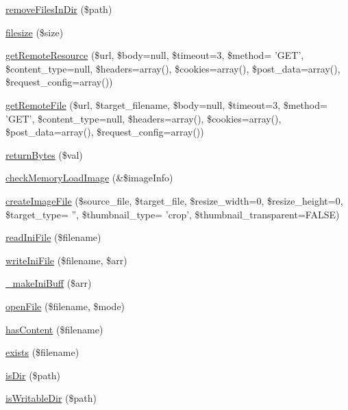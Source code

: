 \begin{DoxyCompactItemize}
\hyperlink{classFileHandler_a07839b4971e9ef40039d23ea65977d69}{remove\-Files\-In\-Dir} (\$path)
\item 
\hyperlink{classFileHandler_ae235b4ded589fb13caed260fabc0a30c}{filesize} (\$size)
\item 
\hyperlink{classFileHandler_a602c039b415c15d9d6866e586282faf7}{get\-Remote\-Resource} (\$url, \$body=null, \$timeout=3, \$method= 'G\-E\-T', \$content\-\_\-type=null, \$headers=array(), \$cookies=array(), \$post\-\_\-data=array(), \$request\-\_\-config=array())
\item 
\hyperlink{classFileHandler_a0e3720cacd0137d537834376ce7b982b}{get\-Remote\-File} (\$url, \$target\-\_\-filename, \$body=null, \$timeout=3, \$method= 'G\-E\-T', \$content\-\_\-type=null, \$headers=array(), \$cookies=array(), \$post\-\_\-data=array(), \$request\-\_\-config=array())
\item 
\hyperlink{classFileHandler_a79dd068137470965b560f4d23d978e7d}{return\-Bytes} (\$val)
\item 
\hyperlink{classFileHandler_a0b240e89b6ce57cb94e855fc25e5e9f3}{check\-Memory\-Load\-Image} (\&\$image\-Info)
\item 
\hyperlink{classFileHandler_a515ef94bb71bc28540e3792ccc234457}{create\-Image\-File} (\$source\-\_\-file, \$target\-\_\-file, \$resize\-\_\-width=0, \$resize\-\_\-height=0, \$target\-\_\-type= '', \$thumbnail\-\_\-type= 'crop', \$thumbnail\-\_\-transparent=F\-A\-L\-S\-E)
\item 
\hyperlink{classFileHandler_a58a8bbae1ab4acb358599db38a47db4d}{read\-Ini\-File} (\$filename)
\item 
\hyperlink{classFileHandler_aa0fd9ce8f2c81bee472a403e75b578bd}{write\-Ini\-File} (\$filename, \$arr)
\item 
\hyperlink{classFileHandler_a8975f9247987757497e0288f3ee09173}{\-\_\-make\-Ini\-Buff} (\$arr)
\item 
\hyperlink{classFileHandler_a690753d8cf8ff837f28a811cdfbfa069}{open\-File} (\$filename, \$mode)
\item 
\hyperlink{classFileHandler_ad872016e83b1f62a03d54e359ce31f73}{has\-Content} (\$filename)
\item 
\hyperlink{classFileHandler_a862c4f6349792ae8f094ec456c9a26ed}{exists} (\$filename)
\item 
\hyperlink{classFileHandler_a5fd371542d6f1a86269d0b8795e74471}{is\-Dir} (\$path)
\item 
\hyperlink{classFileHandler_a9494e34a28f27b6a1ab2e032aada2bbb}{is\-Writable\-Dir} (\$path)
\end{DoxyCompactItemize}
